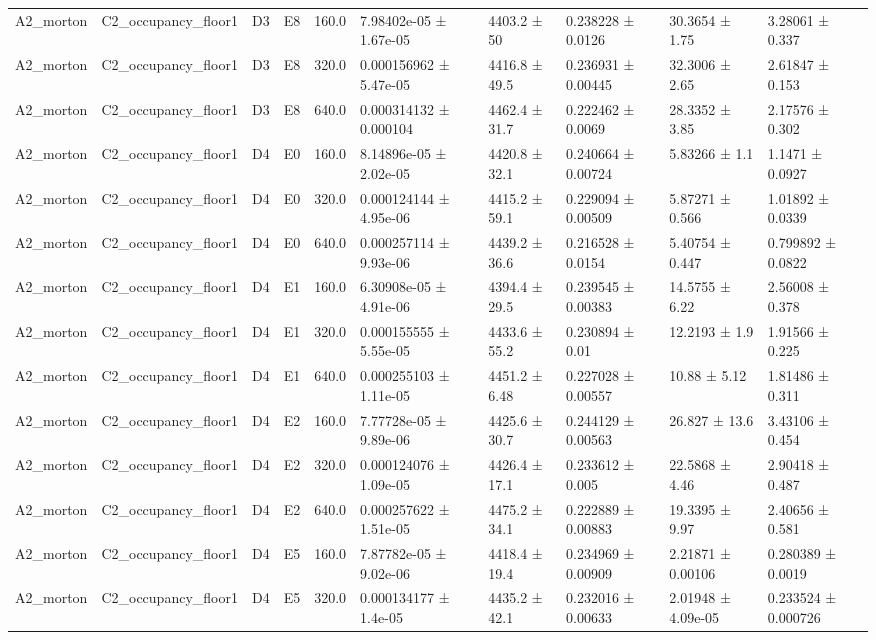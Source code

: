 \begin{table}
\begin{tabular}{llllllllll}
A2\_morton & C2\_occupancy\_floor1 & D3 & E8 & 160.0 & 7.98402e-05 ± 1.67e-05 & 4403.2 ± 50 & 0.238228 ± 0.0126 & 30.3654 ± 1.75 & 3.28061 ± 0.337 \\
A2\_morton & C2\_occupancy\_floor1 & D3 & E8 & 320.0 & 0.000156962 ± 5.47e-05 & 4416.8 ± 49.5 & 0.236931 ± 0.00445 & 32.3006 ± 2.65 & 2.61847 ± 0.153 \\
A2\_morton & C2\_occupancy\_floor1 & D3 & E8 & 640.0 & 0.000314132 ± 0.000104 & 4462.4 ± 31.7 & 0.222462 ± 0.0069 & 28.3352 ± 3.85 & 2.17576 ± 0.302 \\
A2\_morton & C2\_occupancy\_floor1 & D4 & E0 & 160.0 & 8.14896e-05 ± 2.02e-05 & 4420.8 ± 32.1 & 0.240664 ± 0.00724 & 5.83266 ± 1.1 & 1.1471 ± 0.0927 \\
A2\_morton & C2\_occupancy\_floor1 & D4 & E0 & 320.0 & 0.000124144 ± 4.95e-06 & 4415.2 ± 59.1 & 0.229094 ± 0.00509 & 5.87271 ± 0.566 & 1.01892 ± 0.0339 \\
A2\_morton & C2\_occupancy\_floor1 & D4 & E0 & 640.0 & 0.000257114 ± 9.93e-06 & 4439.2 ± 36.6 & 0.216528 ± 0.0154 & 5.40754 ± 0.447 & 0.799892 ± 0.0822 \\
A2\_morton & C2\_occupancy\_floor1 & D4 & E1 & 160.0 & 6.30908e-05 ± 4.91e-06 & 4394.4 ± 29.5 & 0.239545 ± 0.00383 & 14.5755 ± 6.22 & 2.56008 ± 0.378 \\
A2\_morton & C2\_occupancy\_floor1 & D4 & E1 & 320.0 & 0.000155555 ± 5.55e-05 & 4433.6 ± 55.2 & 0.230894 ± 0.01 & 12.2193 ± 1.9 & 1.91566 ± 0.225 \\
A2\_morton & C2\_occupancy\_floor1 & D4 & E1 & 640.0 & 0.000255103 ± 1.11e-05 & 4451.2 ± 6.48 & 0.227028 ± 0.00557 & 10.88 ± 5.12 & 1.81486 ± 0.311 \\
A2\_morton & C2\_occupancy\_floor1 & D4 & E2 & 160.0 & 7.77728e-05 ± 9.89e-06 & 4425.6 ± 30.7 & 0.244129 ± 0.00563 & 26.827 ± 13.6 & 3.43106 ± 0.454 \\
A2\_morton & C2\_occupancy\_floor1 & D4 & E2 & 320.0 & 0.000124076 ± 1.09e-05 & 4426.4 ± 17.1 & 0.233612 ± 0.005 & 22.5868 ± 4.46 & 2.90418 ± 0.487 \\
A2\_morton & C2\_occupancy\_floor1 & D4 & E2 & 640.0 & 0.000257622 ± 1.51e-05 & 4475.2 ± 34.1 & 0.222889 ± 0.00883 & 19.3395 ± 9.97 & 2.40656 ± 0.581 \\
A2\_morton & C2\_occupancy\_floor1 & D4 & E5 & 160.0 & 7.87782e-05 ± 9.02e-06 & 4418.4 ± 19.4 & 0.234969 ± 0.00909 & 2.21871 ± 0.00106 & 0.280389 ± 0.0019 \\
A2\_morton & C2\_occupancy\_floor1 & D4 & E5 & 320.0 & 0.000134177 ± 1.4e-05 & 4435.2 ± 42.1 & 0.232016 ± 0.00633 & 2.01948 ± 4.09e-05 & 0.233524 ± 0.000726 \\

\end{tabular}
\end{table}

